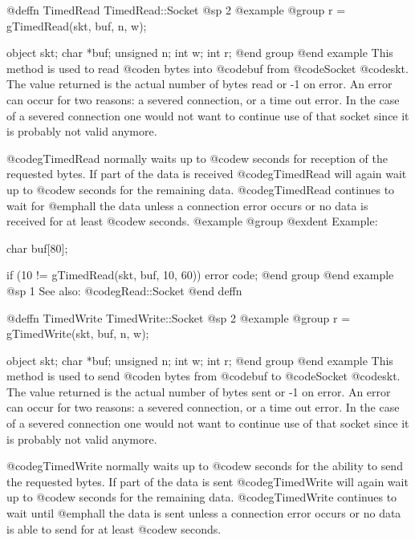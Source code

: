 @deffn {TimedRead} TimedRead::Socket
@sp 2
@example
@group
r = gTimedRead(skt, buf, n, w);

object   skt;
char     *buf;
unsigned n;
int      w;
int      r;
@end group
@end example
This method is used to read @code{n} bytes into @code{buf} from
@code{Socket} @code{skt}.  The value returned is the actual number
of bytes read or -1 on error.  An error can occur for two reasons:
a severed connection, or a time out error.  In the case of a severed
connection one would not want to continue use of that socket since
it is probably not valid anymore.

@code{gTimedRead} normally waits up to @code{w} seconds for reception of the
requested bytes.  If part of the data is received @code{gTimedRead}
will again wait up to @code{w} seconds for the remaining data.  @code{gTimedRead}
continues to wait for @emph{all} the data unless a connection error
occurs or no data is received for at least @code{w} seconds.
@example
@group
@exdent Example:
 
char    buf[80];

if (10 != gTimedRead(skt, buf, 10, 60))
        error code;
@end group
@end example
@sp 1
See also:  @code{gRead::Socket}
@end deffn



















@deffn {TimedWrite} TimedWrite::Socket
@sp 2
@example
@group
r = gTimedWrite(skt, buf, n, w);

object   skt;
char     *buf;
unsigned n;
int      w;
int      r;
@end group
@end example
This method is used to send @code{n} bytes from @code{buf} to
@code{Socket} @code{skt}.  The value returned is the actual number
of bytes sent or -1 on error.  An error can occur for two reasons:
a severed connection, or a time out error.  In the case of a severed
connection one would not want to continue use of that socket since
it is probably not valid anymore.

@code{gTimedWrite} normally waits up to @code{w} seconds for the ability to send the
requested bytes.  If part of the data is sent @code{gTimedWrite} will again
wait up to @code{w} seconds for the remaining data.  @code{gTimedWrite} continues to
wait until @emph{all} the data is sent unless a connection error occurs
or no data is able to send for at least @code{w} seconds.

